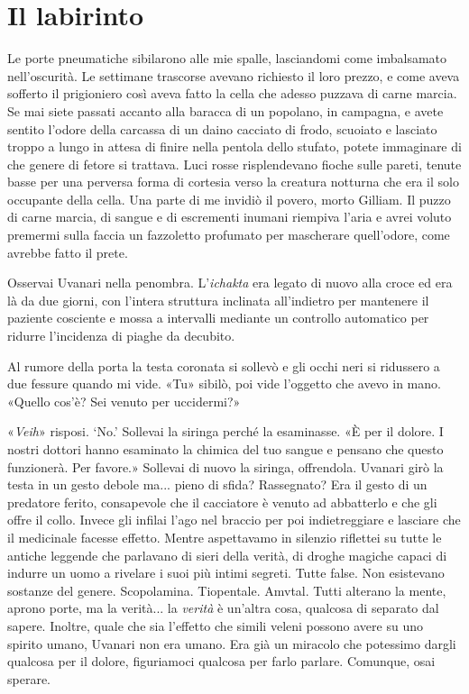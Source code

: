 \chapter{Il labirinto}

Le porte pneumatiche sibilarono alle mie spalle, lasciandomi come
imbalsamato nell'oscurità. Le settimane trascorse avevano richiesto il
loro prezzo, e come aveva sofferto il prigioniero così aveva fatto la
cella che adesso puzzava di carne marcia. Se mai siete passati accanto
alla baracca di un popolano, in campagna, e avete sentito l'odore della
carcassa di un daino cacciato di frodo, scuoiato e lasciato troppo a
lungo in attesa di finire nella pentola dello stufato, potete immaginare
di che genere di fetore si trattava. Luci rosse risplendevano fioche
sulle pareti, tenute basse per una perversa forma di cortesia verso la
creatura notturna che era il solo occupante della cella. Una parte di me
invidiò il povero, morto Gilliam. Il puzzo di carne marcia, di sangue e
di escrementi inumani riempiva l'aria e avrei voluto premermi sulla
faccia un fazzoletto profumato per mascherare quell'odore, come avrebbe
fatto il prete.

Osservai Uvanari nella penombra. L'\emph{ichakta} era legato di nuovo
alla croce ed era là da due giorni, con l'intera struttura inclinata
all'indietro per mantenere il paziente cosciente e mossa a intervalli
mediante un controllo automatico per ridurre l'incidenza di piaghe da
decubito.

Al rumore della porta la testa coronata si sollevò e gli occhi neri si
ridussero a due fessure quando mi vide. «Tu» sibilò, poi vide l'oggetto
che avevo in mano. «Quello cos'è? Sei venuto per uccidermi?»

«\emph{Veih}» risposi. `No.' Sollevai la siringa perché la esaminasse.
«È per il dolore. I nostri dottori hanno esaminato la chimica del tuo
sangue e pensano che questo funzionerà. Per favore.» Sollevai di nuovo
la siringa, offrendola. Uvanari girò la testa in un gesto debole ma...
pieno di sfida? Rassegnato? Era il gesto di un predatore ferito,
consapevole che il cacciatore è venuto ad abbatterlo e che gli offre il
collo. Invece gli infilai l'ago nel braccio per poi indietreggiare e
lasciare che il medicinale facesse effetto. Mentre aspettavamo in
silenzio riflettei su tutte le antiche leggende che parlavano di sieri
della verità, di droghe magiche capaci di indurre un uomo a rivelare i
suoi più intimi segreti. Tutte false. Non esistevano sostanze del
genere. Scopolamina. Tiopentale. Amvtal. Tutti alterano la mente, aprono
porte, ma la verità... la \emph{verità} è un'altra cosa, qualcosa di
separato dal sapere. Inoltre, quale che sia l'effetto che simili veleni
possono avere su uno spirito umano, Uvanari non era umano. Era già un
miracolo che potessimo dargli qualcosa per il dolore, figuriamoci
qualcosa per farlo parlare. Comunque, osai sperare.

